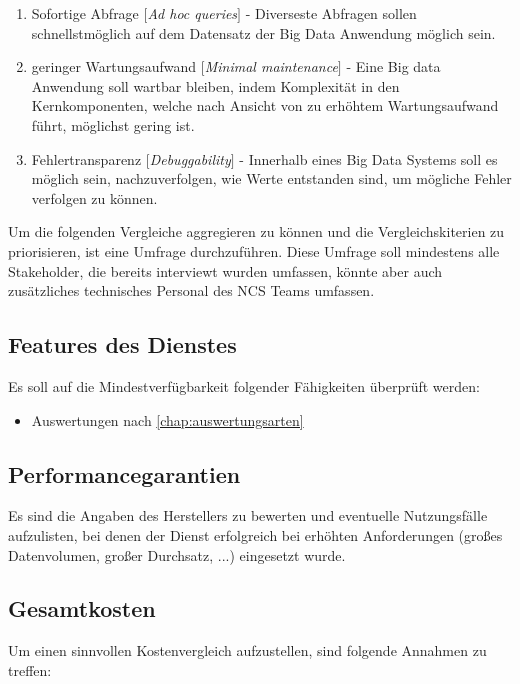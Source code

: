 \begin{enumerate}
\item Sofortige Abfrage $\lbrack$\textit{Ad hoc queries}$\rbrack$ - 
Diverseste Abfragen sollen schnellstmöglich auf dem Datensatz der Big Data Anwendung möglich sein.

\item geringer Wartungsaufwand $\lbrack$\textit{Minimal maintenance}$\rbrack$ - 
Eine Big data Anwendung soll wartbar bleiben, indem Komplexität in den Kernkomponenten, welche nach Ansicht von \citeauthor{Marz.2015} zu erhöhtem Wartungsaufwand führt, möglichst gering ist.

\item Fehlertransparenz $\lbrack$\textit{Debuggability}$\rbrack$ - 
Innerhalb eines Big Data Systems soll es möglich sein, nachzuverfolgen, wie Werte entstanden sind, um mögliche Fehler verfolgen zu können.
\end{enumerate}

Um die folgenden Vergleiche aggregieren zu können und die Vergleichskiterien zu priorisieren, ist eine Umfrage durchzuführen. Diese Umfrage soll mindestens alle Stakeholder, die bereits interviewt wurden umfassen, könnte aber auch zusätzliches technisches Personal des \ac{NCS} Teams umfassen.


\subsection{Features des Dienstes}
Es soll auf die Mindestverfügbarkeit folgender Fähigkeiten überprüft werden:
\begin{itemize}
\item Auswertungen nach \autoref{chap:auswertungsarten}
\end{itemize}

\subsection{Performancegarantien}
Es sind die Angaben des Herstellers zu bewerten und eventuelle Nutzungsfälle aufzulisten, bei denen der Dienst erfolgreich bei erhöhten Anforderungen (großes Datenvolumen, großer Durchsatz, ...) eingesetzt wurde.

\subsection{Gesamtkosten}
Um einen sinnvollen Kostenvergleich aufzustellen, sind folgende Annahmen zu treffen:

